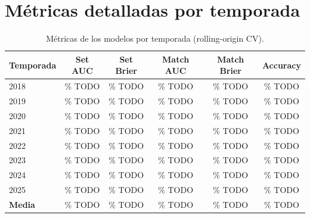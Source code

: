 \chapter{M\'etricas detalladas por temporada}
\label{app:metricas}

\begin{table}[htbp]
\centering
\caption{M\'etricas de los modelos por temporada (rolling-origin CV).}
\label{tab:metricas}
\begin{tabular}{@{}lccccc@{}}
\toprule
\textbf{Temporada} & \textbf{Set AUC} & \textbf{Set Brier} & \textbf{Match AUC} & \textbf{Match Brier} & \textbf{Accuracy} \\
\midrule
2018    & \% TODO & \% TODO & \% TODO & \% TODO & \% TODO \\
2019    & \% TODO & \% TODO & \% TODO & \% TODO & \% TODO \\
2020    & \% TODO & \% TODO & \% TODO & \% TODO & \% TODO \\
2021    & \% TODO & \% TODO & \% TODO & \% TODO & \% TODO \\
2022    & \% TODO & \% TODO & \% TODO & \% TODO & \% TODO \\
2023    & \% TODO & \% TODO & \% TODO & \% TODO & \% TODO \\
2024    & \% TODO & \% TODO & \% TODO & \% TODO & \% TODO \\
2025    & \% TODO & \% TODO & \% TODO & \% TODO & \% TODO \\
\midrule
\textbf{Media} & \% TODO & \% TODO & \% TODO & \% TODO & \% TODO \\
\bottomrule
\end{tabular}
\end{table}

